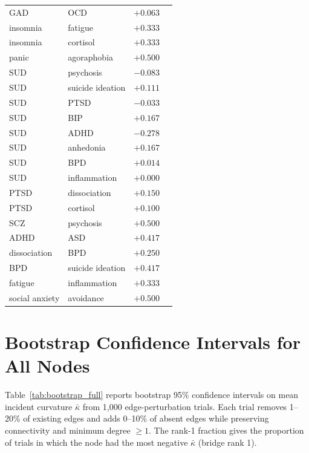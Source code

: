 \documentclass{article}
\begin{document}
\begin{table}[h]
\begin{tabular}{llrl}
GAD & OCD & $+0.063$ & \citep{abramowitz2003obsessive} \\
insomnia & fatigue & $+0.333$ & \citep{lichstein1997insomnia} \\
insomnia & cortisol & $+0.333$ & \citep{vgontzas2001chronic} \\
panic & agoraphobia & $+0.500$ & \citep{apa2013dsm5} \\
SUD & psychosis & $-0.083$ & \citep{niemipynttari2013substance} \\
SUD & suicide ideation & $+0.111$ & \citep{wilcox2004association} \\
SUD & PTSD & $-0.033$ & \citep{jacobsen2001substance} \\
SUD & BIP & $+0.167$ & \citep{regier1990comorbidity} \\
SUD & ADHD & $-0.278$ & \citep{lee2011prospective} \\
SUD & anhedonia & $+0.167$ & \citep{garfield2014anhedonia} \\
SUD & BPD & $+0.014$ & \citep{trull2000borderline} \\
SUD & inflammation & $+0.000$ & \citep{crews2006cytokines} \\
PTSD & dissociation & $+0.150$ & \citep{lanius2010emotion} \\
PTSD & cortisol & $+0.100$ & \citep{yehuda2006advances} \\
SCZ & psychosis & $+0.500$ & \citep{apa2013dsm5} \\
ADHD & ASD & $+0.417$ & \citep{rommelse2010shared} \\
dissociation & BPD & $+0.250$ & \citep{zanarini2000dissociative} \\
BPD & suicide ideation & $+0.417$ & \citep{soloff2000suicidal} \\
fatigue & inflammation & $+0.333$ & \citep{bower2009inflammatory} \\
social anxiety & avoidance & $+0.500$ & \citep{hofmann2007cognitive} \\
\bottomrule
\end{tabular}
\end{table}

\clearpage
\section{Bootstrap Confidence Intervals for All Nodes}
\label{app:bootstrap}

Table~\ref{tab:bootstrap_full} reports bootstrap 95\% confidence intervals on mean incident curvature $\bar\kappa$ from 1{,}000 edge-perturbation trials. Each trial removes 1--20\% of existing edges and adds 0--10\% of absent edges while preserving connectivity and minimum degree $\geq 1$. The rank-1 fraction gives the proportion of trials in which the node had the most negative $\bar\kappa$ (bridge rank 1).
\end{document}
